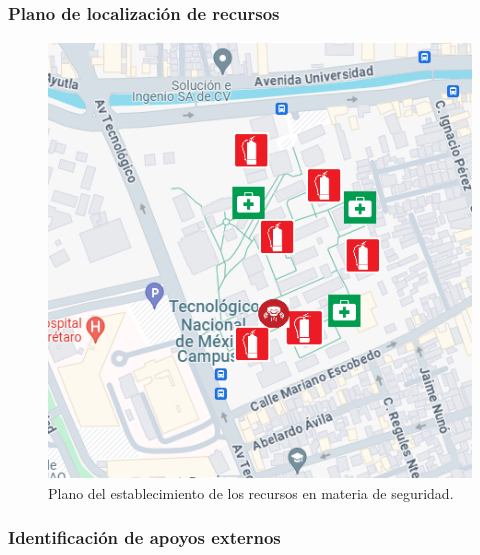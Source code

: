     \subsubsection{Plano de localización de recursos}
    \begin{figure}[H]
        \centering
        \includegraphics[scale=0.4]{35/Img/mapaEB.png}
        \caption{Plano del establecimiento de los recursos en materia de seguridad.}
    \end{figure}
    
    \subsubsection{ Identificación de apoyos externos}
    
